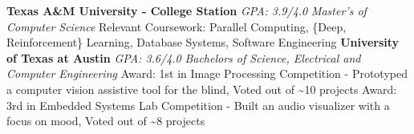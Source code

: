 %
%
%


\begin{scholarship}
					{\textbf{Texas A\&M University - College Station} \hfill \emph{GPA: 3.9/4.0}\newline
					\emph{Master's of Computer Science}\newline
					Relevant Coursework: Parallel Computing, \{Deep, Reinforcement\} Learning, Database Systems, Software Engineering}
	\scholarshipentry{}
					{\textbf{University of Texas at Austin} \hfill \emph{GPA: 3.6/4.0}\newline
					\emph{Bachelors of Science, Electrical and Computer Engineering}\newline
					Award: 1st in Image Processing Competition - Prototyped a computer vision assistive tool for the blind, Voted out of \textasciitilde10 projects\newline
					Award: 3rd in Embedded Systems Lab Competition - Built an audio visualizer with a focus on mood, Voted out of \textasciitilde8 projects}
\end{scholarship}
